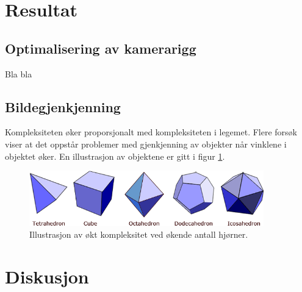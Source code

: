 \documentclass[a4paper, 11pt]{article}
\begin{document}
\begin{malsetning}

\end{malsetning}


 \newpage
\section{Resultat}

\subsection{Optimalisering av kamerarigg}
Bla bla
\begin{rigg}

\end{rigg}
\subsection{Bildegjenkjenning}

Kompleksiteten øker proporsjonalt med kompleksiteten i legemet. Flere forsøk viser at det oppstår problemer med gjenkjenning av objekter når vinklene i objektet øker. En illustrasjon av objektene er gitt i figur \ref{fig:platonic}.

\begin{figure}[h]
\centering
\includegraphics[width=4in]{figurer/platonic-solids.gif}
\caption{Illustrasjon av økt kompleksitet ved økende antall hjørner. \cite{platonic} }
\label{fig:platonic}
\end{figure}

 \newpage
\section{Diskusjon}




\newpage


\end{document}
